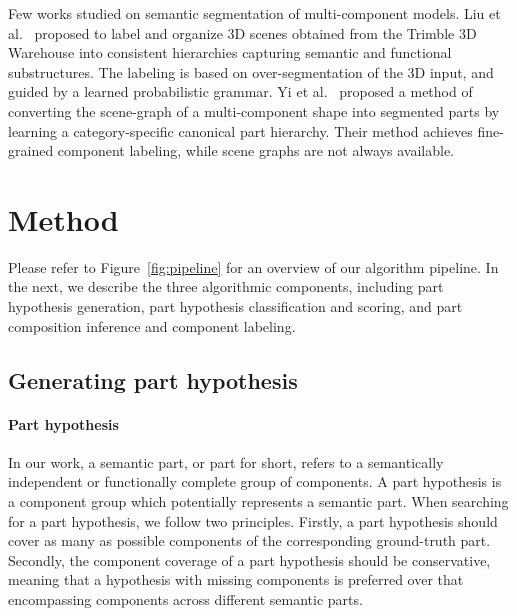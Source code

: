 \documentclass[acmtog]{acmart}
\begin{document}
Few works studied on semantic segmentation of multi-component models.
Liu et al.~ proposed to label and organize 3D scenes obtained from the Trimble 3D Warehouse
into consistent hierarchies capturing semantic and functional substructures.
The labeling is based on over-segmentation of the 3D input,
and guided by a learned probabilistic grammar.
Yi et al.~ proposed a method of
converting the scene-graph of a multi-component shape into segmented parts
by learning a category-specific canonical part hierarchy.
Their method achieves fine-grained component labeling,
while scene graphs are not always available.
 
\section{Method}
\label{sec:method}
Please refer to Figure~\ref{fig:pipeline} for an overview of our algorithm pipeline.
In the next, we describe the three algorithmic components, including part hypothesis generation,
part hypothesis classification and scoring, and part composition inference and component labeling.



\subsection{Generating part hypothesis}
\label{sec:sampling}
\paragraph{\textbf{Part hypothesis}}
In our work, a semantic part, or part for short, refers to a semantically independent or functionally complete group of components. A part hypothesis is a component group which potentially represents a semantic part.
When searching for a part hypothesis, we follow two principles.
Firstly, a part hypothesis should cover as many as possible components of the corresponding ground-truth part.
Secondly, the component coverage of a part hypothesis should be conservative, meaning that
a hypothesis with missing components is preferred over that encompassing components across different
semantic parts.
\end{document}
